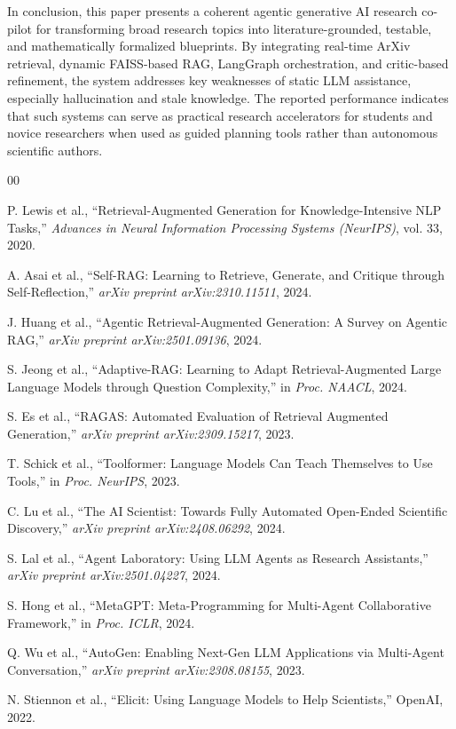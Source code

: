 \documentclass[conference]{IEEEtran}
\begin{document}
In conclusion, this paper presents a coherent agentic generative AI research co-pilot for transforming broad research topics into literature-grounded, testable, and mathematically formalized blueprints. By integrating real-time ArXiv retrieval, dynamic FAISS-based RAG, LangGraph orchestration, and critic-based refinement, the system addresses key weaknesses of static LLM assistance, especially hallucination and stale knowledge. The reported performance indicates that such systems can serve as practical research accelerators for students and novice researchers when used as guided planning tools rather than autonomous scientific authors.

\begin{thebibliography}{00}

 P. Lewis et al., ``Retrieval-Augmented Generation for Knowledge-Intensive NLP Tasks,'' \textit{Advances in Neural Information Processing Systems (NeurIPS)}, vol. 33, 2020.

 A. Asai et al., ``Self-RAG: Learning to Retrieve, Generate, and Critique through Self-Reflection,'' \textit{arXiv preprint arXiv:2310.11511}, 2024.

 J. Huang et al., ``Agentic Retrieval-Augmented Generation: A Survey on Agentic RAG,'' \textit{arXiv preprint arXiv:2501.09136}, 2024.

 S. Jeong et al., ``Adaptive-RAG: Learning to Adapt Retrieval-Augmented Large Language Models through Question Complexity,'' in \textit{Proc. NAACL}, 2024.

 S. Es et al., ``RAGAS: Automated Evaluation of Retrieval Augmented Generation,'' \textit{arXiv preprint arXiv:2309.15217}, 2023.

 T. Schick et al., ``Toolformer: Language Models Can Teach Themselves to Use Tools,'' in \textit{Proc. NeurIPS}, 2023.

 C. Lu et al., ``The AI Scientist: Towards Fully Automated Open-Ended Scientific Discovery,'' \textit{arXiv preprint arXiv:2408.06292}, 2024.

 S. Lal et al., ``Agent Laboratory: Using LLM Agents as Research Assistants,'' \textit{arXiv preprint arXiv:2501.04227}, 2024.

 S. Hong et al., ``MetaGPT: Meta-Programming for Multi-Agent Collaborative Framework,'' in \textit{Proc. ICLR}, 2024.

 Q. Wu et al., ``AutoGen: Enabling Next-Gen LLM Applications via Multi-Agent Conversation,'' \textit{arXiv preprint arXiv:2308.08155}, 2023.

 N. Stiennon et al., ``Elicit: Using Language Models to Help Scientists,'' OpenAI, 2022.

\end{thebibliography}
\end{document}
